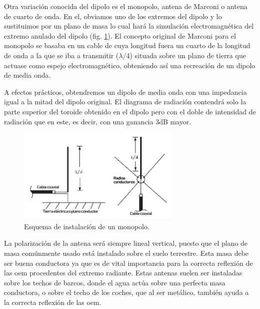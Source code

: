 \par Otra variación conocida del dipolo es el monopolo, antena de Marconi o antena de cuarto de onda. En el, obviamos uno de los extremos del dipolo y lo sustituimos por un plano de masa lo cual hará la simulación electromagnética del extremo anulado del dipolo (fig. \ref{fig:monopolo}). El concepto original de Marconi para el monopolo se basaba en un cable de cuya longitud fuera un cuarto de la longitud de onda a la que se iba a transmitir ($\lambda$/4) situada sobre un plano de tierra que actuase como espejo electromagnético, obteniendo así una recreación de un dipolo de media onda.
\\
\par A efectos prácticos, obtendremos un dipolo de media onda con una impedancia igual a la mitad del dipolo original. El diagrama de radiación contendrá solo la parte superior del toroide obtenido en el dipolo pero con el doble de intensidad de radiación que en este, es decir, con una ganancia 3dB mayor.
\\
\begin{figure}[h]
    \centering
        \includegraphics[width=0.7\textwidth]{archivos/monopolo/monoesquema}
        \caption{Esquema de instalación de un monopolo. \cite{Frenzel2013}}
        \label{fig:monopolo}
\end{figure}

\par La polarización de la antena será siempre lineal vertical, puesto que el plano de masa comúnmente usado está instalado sobre el suelo terrestre. Esta masa debe ser buena conductora ya que es de vital importancia para la correcta reflexión de las \gls{oem} procedentes del extremo radiante. Estas antenas suelen ser instaladas sobre los techos de barcos, donde el agua actúa sobre una perfecta masa conductora, o sobre el techo de los coches, que al ser metálico, también ayuda a la correcta reflexión de las \gls{oem}. 
\\

